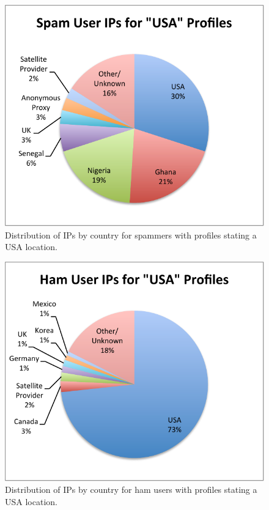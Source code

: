 \documentclass[preprint]{acm_proc_article-sp}
\begin{document}
\begin{figure}[h]
    \centering
    \includegraphics[width=\linewidth]{figures/ips-usa-spam.pdf}
    \caption{Distribution of IPs by country for spammers with profiles stating a USA location.}
    \label{fig:usaspam}
\end{figure}

\begin{figure}[h]
    \centering
    \includegraphics[width=\linewidth]{figures/ips-usa-ham.pdf}
    \caption{Distribution of IPs by country for ham users with profiles stating a USA location.}
    \label{fig:usaham}
\end{figure}
\end{document}
